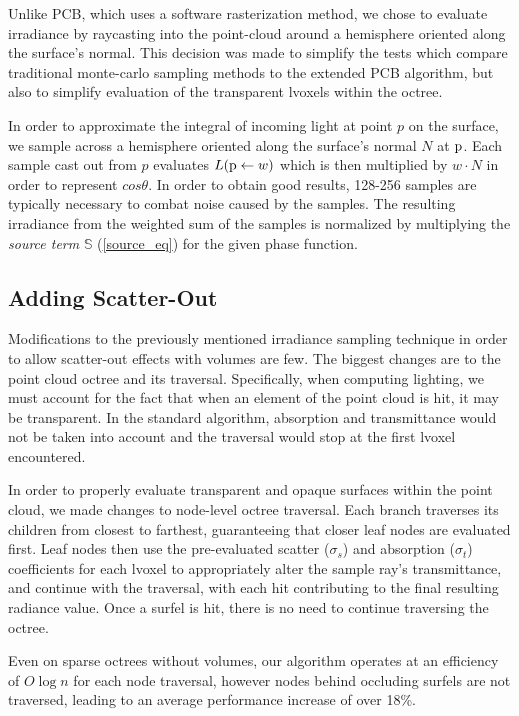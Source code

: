 \documentclass[runningheads]{llncs}
\begin{document}
Unlike PCB, which uses a software rasterization method, we chose to evaluate irradiance by raycasting into the point-cloud around a hemisphere oriented along the surface's normal.  This decision was made to simplify the tests which compare traditional monte-carlo sampling methods to the extended PCB algorithm, but also to simplify evaluation of the transparent lvoxels within the octree.

In order to approximate the integral of incoming light at point $p$ on the surface, we sample across a hemisphere oriented along the surface's normal $N$ at $\textup{p}$.  Each sample cast out from $p$ evaluates $L(\textup{p} \leftarrow w)$ which is then multiplied by $w \cdot N$ in order to represent $cos\theta$.  In order to obtain good results, 128-256 samples are typically necessary to combat noise caused by the samples.  The resulting irradiance from the weighted sum of the samples is normalized by multiplying the \textit{source term} $\mathbb{S}$ (\ref{source_eq}) for the given phase function. 


\subsection{Adding Scatter-Out}
\label{scatterout_sec}
Modifications to the previously mentioned irradiance sampling technique in order to allow scatter-out effects with volumes are few.  The biggest changes are to the point cloud octree and its traversal.  Specifically, when computing lighting, we must account for the fact that when an element of the point cloud is hit, it may be transparent.  In the standard algorithm, absorption and transmittance would not be taken into account and the traversal would stop at the first lvoxel encountered.

In order to properly evaluate transparent and opaque surfaces within the point cloud, we made changes to node-level octree traversal.  Each branch traverses its children from closest to farthest, guaranteeing that closer leaf nodes are evaluated first.  Leaf nodes then use the pre-evaluated scatter ($\sigma_{s}$) and absorption ($\sigma_{t}$) coefficients for each lvoxel to appropriately alter the sample ray's transmittance, and continue with the traversal, with each hit contributing to the final resulting radiance value.  Once a surfel is hit, there is no need to continue traversing the octree.

Even on sparse octrees without volumes, our algorithm operates at an efficiency of $O\log{n}$ for each node traversal, however nodes behind occluding surfels are not traversed, leading to an average performance increase of over 18\%.
\end{document}
